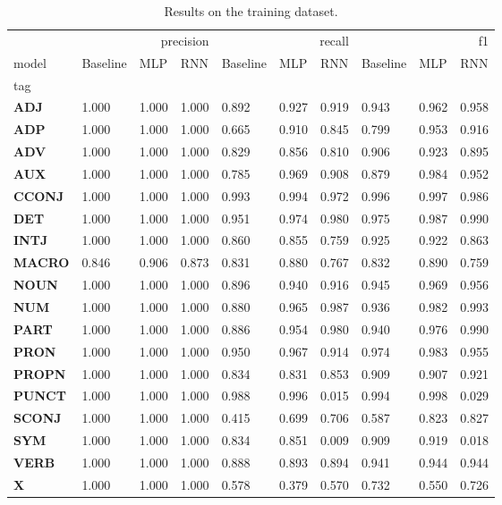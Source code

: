 \begin{table}
\caption{Results on the training dataset.}
\label{tab::ex_2_train}
\begin{tabular}{|l||l||l||l||l||l||l||l||l||l|}
\toprule
 & \multicolumn{3}{r}{precision} & \multicolumn{3}{r}{recall} & \multicolumn{3}{r}{f1} \\
model & Baseline & MLP & RNN & Baseline & MLP & RNN & Baseline & MLP & RNN \\
tag &  &  &  &  &  &  &  &  &  \\
\midrule
\textbf{ADJ} & 1.000 & 1.000 & 1.000 & 0.892 & 0.927 & 0.919 & 0.943 & 0.962 & 0.958 \\
\textbf{ADP} & 1.000 & 1.000 & 1.000 & 0.665 & 0.910 & 0.845 & 0.799 & 0.953 & 0.916 \\
\textbf{ADV} & 1.000 & 1.000 & 1.000 & 0.829 & 0.856 & 0.810 & 0.906 & 0.923 & 0.895 \\
\textbf{AUX} & 1.000 & 1.000 & 1.000 & 0.785 & 0.969 & 0.908 & 0.879 & 0.984 & 0.952 \\
\textbf{CCONJ} & 1.000 & 1.000 & 1.000 & 0.993 & 0.994 & 0.972 & 0.996 & 0.997 & 0.986 \\
\textbf{DET} & 1.000 & 1.000 & 1.000 & 0.951 & 0.974 & 0.980 & 0.975 & 0.987 & 0.990 \\
\textbf{INTJ} & 1.000 & 1.000 & 1.000 & 0.860 & 0.855 & 0.759 & 0.925 & 0.922 & 0.863 \\
\textbf{MACRO} & 0.846 & 0.906 & 0.873 & 0.831 & 0.880 & 0.767 & 0.832 & 0.890 & 0.759 \\
\textbf{NOUN} & 1.000 & 1.000 & 1.000 & 0.896 & 0.940 & 0.916 & 0.945 & 0.969 & 0.956 \\
\textbf{NUM} & 1.000 & 1.000 & 1.000 & 0.880 & 0.965 & 0.987 & 0.936 & 0.982 & 0.993 \\
\textbf{PART} & 1.000 & 1.000 & 1.000 & 0.886 & 0.954 & 0.980 & 0.940 & 0.976 & 0.990 \\
\textbf{PRON} & 1.000 & 1.000 & 1.000 & 0.950 & 0.967 & 0.914 & 0.974 & 0.983 & 0.955 \\
\textbf{PROPN} & 1.000 & 1.000 & 1.000 & 0.834 & 0.831 & 0.853 & 0.909 & 0.907 & 0.921 \\
\textbf{PUNCT} & 1.000 & 1.000 & 1.000 & 0.988 & 0.996 & 0.015 & 0.994 & 0.998 & 0.029 \\
\textbf{SCONJ} & 1.000 & 1.000 & 1.000 & 0.415 & 0.699 & 0.706 & 0.587 & 0.823 & 0.827 \\
\textbf{SYM} & 1.000 & 1.000 & 1.000 & 0.834 & 0.851 & 0.009 & 0.909 & 0.919 & 0.018 \\
\textbf{VERB} & 1.000 & 1.000 & 1.000 & 0.888 & 0.893 & 0.894 & 0.941 & 0.944 & 0.944 \\
\textbf{X} & 1.000 & 1.000 & 1.000 & 0.578 & 0.379 & 0.570 & 0.732 & 0.550 & 0.726 \\
\bottomrule
\end{tabular}
\end{table}
